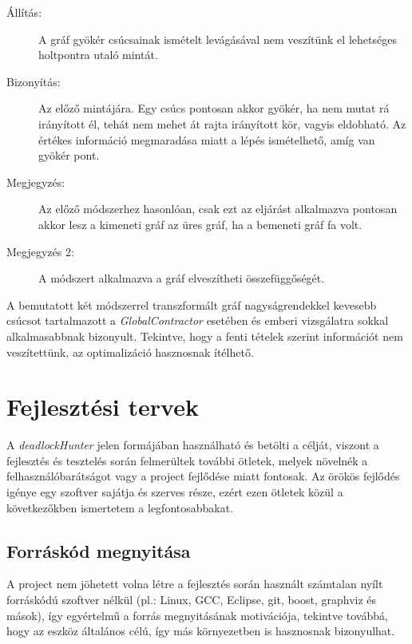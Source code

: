     \begin{description}
        \item[Állítás:] A gráf gyökér csúcsainak ismételt levágásával nem veszítünk el lehetséges holtpontra utaló mintát.
        \item[Bizonyítás:] Az előző mintájára. Egy csúcs pontosan akkor gyökér, ha nem mutat rá irányított él, tehát nem mehet át rajta irányított kör, vagyis eldobható. Az értékes információ megmaradása miatt a lépés ismételhető, amíg van gyökér pont.
        \item[Megjegyzés:] Az előző módszerhez hasonlóan, csak ezt az eljárást alkalmazva pontosan akkor lesz a kimeneti gráf az üres gráf, ha a bemeneti gráf fa volt.
        \item[Megjegyzés 2:] A módszert alkalmazva a gráf elveszítheti összefüggőségét.
    \end{description}
%    
    A bemutatott két módszerrel transzformált gráf nagyságrendekkel kevesebb csúcsot tartalmazott a \emph{GlobalContractor} esetében és emberi vizsgálatra sokkal alkalmasabbnak bizonyult. Tekintve, hogy a fenti tételek szerint információt nem veszítettünk, az optimalizáció hasznosnak ítélhető.
    
    
    \section{Fejlesztési tervek}
    A \emph{deadlockHunter} jelen formájában használható és betölti a célját, viszont a fejlesztés és tesztelés során felmerültek további ötletek, melyek növelnék a felhasználóbarátságot vagy a project fejlődése miatt fontosak. Az örökös fejlődés igénye egy szoftver sajátja és szerves része, ezért ezen ötletek közül a következőkben ismertetem a legfontosabbakat.
    
    \subsection{Forráskód megnyitása}
    A project nem jöhetett volna létre a fejlesztés során használt számtalan nyílt forráskódú szoftver nélkül (pl.: Linux, GCC, Eclipse, git, boost, graphviz és mások), így egyértelmű a forrás megnyitásának motivációja, tekintve továbbá, hogy az eszköz általános célú, így más környezetben is hasznosnak bizonyulhat.
    
